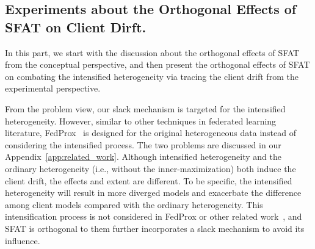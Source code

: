 \documentclass{article} %
\theoremstyle{plain}
\theoremstyle{definition}
\theoremstyle{remark}
\begin{document}






\subsection{Experiments about the Orthogonal Effects of SFAT on Client Dirft.}
\label{app:orthogonal_effect.}

In this part, we start with the discussion about the orthogonal effects of SFAT from the conceptual perspective, and then present the orthogonal effects of SFAT on combating the intensified heterogeneity via tracing the client drift from the experimental perspective. 

From the problem view, our slack mechanism is targeted for the intensified heterogeneity. However, similar to other techniques in federated learning literature, FedProx~\citep{li2018federated} is designed for the original heterogeneous data instead of considering the intensified process. The two problems are discussed in our Appendix~\ref{app:related_work}. Although intensified heterogeneity and the ordinary heterogeneity (i.e., without the inner-maximization) both induce the client drift, the effects and extent are different. To be specific, the intensified heterogeneity will result in more diverged models and exacerbate the difference among client models compared with the ordinary heterogeneity. This intensification process is not considered in FedProx or other related work~\citep{mcmahan2017communication, karimireddy2020scaffold}, and SFAT is orthogonal to them further incorporates a slack mechanism to avoid its influence.
\end{document}
